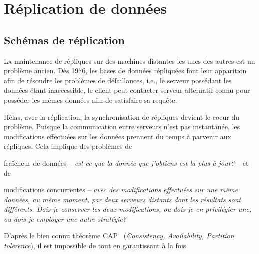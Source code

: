 
\part{Réplication de données}
\chapter{Schémas de réplication}

\lettrine{L}a maintenance de répliques sur des machines distantes les unes des
autres est un problème ancien. Dès 1976, les bases de données répliquées font
leur apparition afin de résoudre les problèmes de défaillances, i.e., le serveur
possédant les données étant inaccessible, le client peut contacter serveur
alternatif connu pour posséder les mêmes données afin de satisfaire sa requête.

Hélas, avec la réplication, la synchronisation de répliques devient le coeur du
problème. Puisque la communication entre serveurs n'est pas instantanée, les
modifications effectuées sur les données prennent du temps à parvenir aux
répliques. Cela implique des problèmes de
\begin{inparaenum}[(i)]
\item fraîcheur de données -- \emph{est-ce que la donnée que j'obtiens est la
    plus à jour?} -- et de
\item modifications concurrentes -- \emph{avec des modifications effectuées sur
    une même données, au même moment, par deux serveurs distants dont les
    résultats sont différents. Dois-je conserver les deux modifications, ou
    dois-je en privilégier une, ou dois-je employer une autre stratégie?}
\end{inparaenum}

D'après le bien connu théorème CAP~\cite{gilbert2002brewer} (\emph{Consistency,
  Availability, Partition tolerence}), il est impossible de  tout en garantissant à la fois 

